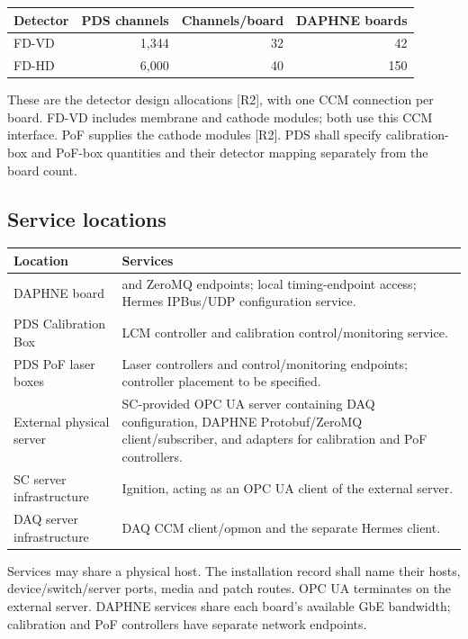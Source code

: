 \begin{center}
\begin{tabular}{lrrr}
\toprule
\textbf{Detector} & \textbf{PDS channels} & \textbf{Channels/board} & \textbf{DAPHNE boards} \\
\midrule
FD-VD & 1,344 & 32 & 42 \\
FD-HD & 6,000 & 40 & 150 \\
\bottomrule
\end{tabular}
\end{center}
These are the detector design allocations [R2], with one CCM connection per
board. FD-VD includes membrane and cathode modules; both use this CCM interface.
PoF supplies the cathode modules [R2]. PDS shall specify calibration-box and
PoF-box quantities and their detector mapping separately from the board count.

\subsection{Service locations}

\begin{center}\small
\begin{tabular}{L{0.25\textwidth}L{0.68\textwidth}}
\toprule
\textbf{Location} & \textbf{Services} \\
\midrule
DAPHNE board &  and ZeroMQ endpoints; local timing-endpoint access; Hermes IPBus/UDP configuration service. \\
PDS Calibration Box & LCM controller and calibration control/monitoring service. \\
PDS PoF laser boxes & Laser controllers and control/monitoring endpoints; controller placement to be specified. \\
External physical server & SC-provided OPC UA server containing DAQ configuration, DAPHNE Protobuf/ZeroMQ client/subscriber, and adapters for calibration and PoF controllers. \\
SC server infrastructure & Ignition, acting as an OPC UA client of the external server. \\
DAQ server infrastructure & DAQ CCM client/opmon and the separate Hermes client. \\
\bottomrule
\end{tabular}
\end{center}

Services may share a physical host. The installation record shall name their
hosts, device/switch/server ports, media and patch routes. OPC UA terminates on
the external server. DAPHNE services share each board's available GbE bandwidth;
calibration and PoF controllers have separate network endpoints.
